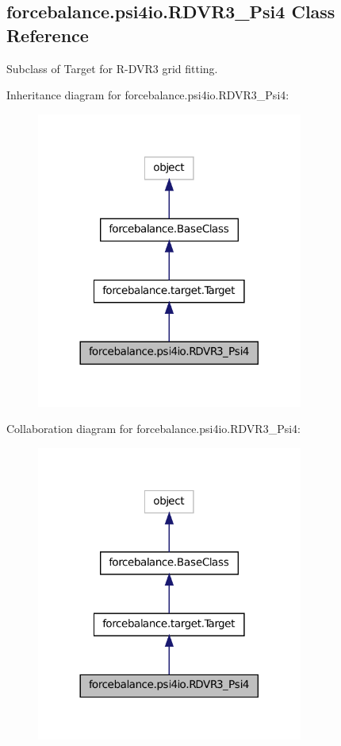 \hypertarget{classforcebalance_1_1psi4io_1_1RDVR3__Psi4}{\subsection{forcebalance.\-psi4io.\-R\-D\-V\-R3\-\_\-\-Psi4 Class Reference}
\label{classforcebalance_1_1psi4io_1_1RDVR3__Psi4}
}


Subclass of Target for R-\/\-D\-V\-R3 grid fitting.  




Inheritance diagram for forcebalance.\-psi4io.\-R\-D\-V\-R3\-\_\-\-Psi4\-:\nopagebreak
\begin{figure}[H]
\begin{center}
\leavevmode
\includegraphics[width=248pt]{classforcebalance_1_1psi4io_1_1RDVR3__Psi4__inherit__graph}
\end{center}
\end{figure}


Collaboration diagram for forcebalance.\-psi4io.\-R\-D\-V\-R3\-\_\-\-Psi4\-:\nopagebreak
\begin{figure}[H]
\begin{center}
\leavevmode
\includegraphics[width=248pt]{classforcebalance_1_1psi4io_1_1RDVR3__Psi4__coll__graph}
\end{center}
\end{figure}
